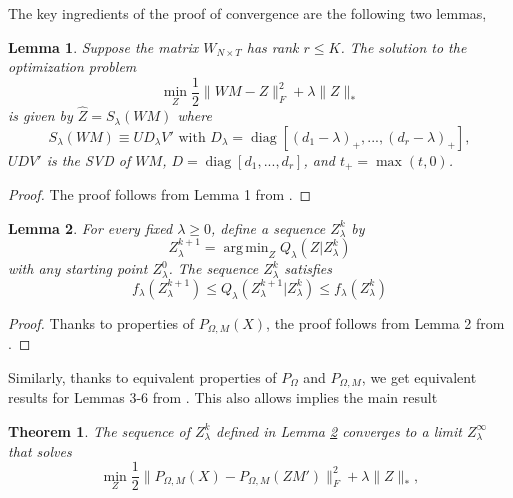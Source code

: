 \documentclass[preprint]{imsart}
\numberwithin{equation}{section}
\theoremstyle{plain}
\newtheorem{theorem}{Theorem}
\newtheorem{lemma}{Lemma}
\DeclareMathOperator*{\argmin}{arg\,min}
\DeclareMathOperator*{\diag}{diag}
\begin{document}
The key ingredients of the proof of convergence are the following two lemmas,
\begin{lemma}
Suppose the matrix $W_{N \times T}$ has rank $r \leq K$. The solution to the optimization problem
\begin{equation}\label{eq:lemma1}
\min_Z \frac{1}{2}\|WM - Z \|_F^2 + \lambda\|Z\|_*
\end{equation}
is given by $\hat{Z} = S_\lambda(WM)$ where
\[
S_\lambda(WM) \equiv UD_\lambda V' \text{ with } D_\lambda = \diag[(d_1 - \lambda)_+, ..., (d_r - \lambda)_+],
\]
$UDV'$ is the SVD of $WM$, $D = \diag[d_1,...,d_r]$, and $t_+ = \max(t,0)$.
\end{lemma}
\begin{proof}
The proof follows from Lemma 1 from \citep{mazumder2010spectral}. %
\end{proof}
\begin{lemma}\label{eq:z-sequence}
For every fixed $\lambda \geq 0$, define a sequence $Z_\lambda^k$ by
\[
Z_\lambda^{k+1} = \argmin_Z Q_\lambda(Z|Z_\lambda^k)
\]
with any starting point $Z_\lambda^0$. The sequence $Z_\lambda^k$ satisfies 
\[
f_\lambda(Z_\lambda^{k+1}) \leq  Q_\lambda(Z_\lambda^{k+1} | Z_\lambda^k ) \leq f_\lambda(Z_\lambda^{k})
\]
\end{lemma}
\begin{proof}
Thanks to properties of $P_{\Omega,M}(X)$, the proof follows from Lemma 2 from \citep{mazumder2010spectral}.
\end{proof}
Similarly, thanks to equivalent properties of $P_\Omega$ and $P_{\Omega,M}$, we get equivalent results for Lemmas 3-6 from \citep{mazumder2010spectral}. This also allows implies the main result
\begin{theorem}
The sequence of $Z_{\lambda}^k$ defined in Lemma \ref{eq:z-sequence} converges to a limit $Z_\lambda^\infty$ that solves
\[
\min_Z \frac{1}{2} \|P_{\Omega,M}(X) - P_{\Omega,M}(ZM')\|_F^2 + \lambda\|Z\|_*,
\]
\end{theorem}
\end{document}
